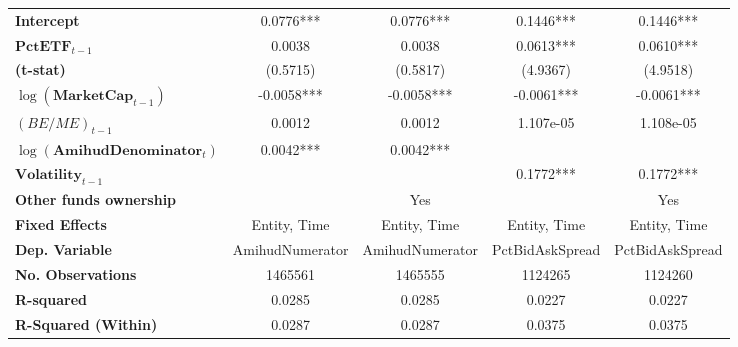 {\begin{longtable}{>{\bfseries}lcccc}
Intercept                                &        0.0776***       &             0.0776***             &        0.1446***       &              0.1446***      \\
\rowcolor{blue!20}
$\mathbf{PctETF}_{t-1}$       &        0.0038       &             0.0038             &        0.0613***      &              0.0610***              \\
(t-stat)                                 &       (0.5715)      &            (0.5817)            &       (4.9367)      &             (4.9518)             \\
$\log(\mathbf{MarketCap}_{t-1})$   &       -0.0058***       &            -0.0058***             &       -0.0061***       &             -0.0061***              \\
$\left(BE/ME\right)_{t-1}$            &        0.0012       &             0.0012             &      1.107e-05      &            1.108e-05             \\
$\log(\mathbf{AmihudDenominator}_t)$         &        0.0042***       &             0.0042***             &                     &                                  \\
$\mathbf{Volatility}_{t-1}$                  &                     &                                &        0.1772***       &              0.1772***              \\
Other funds ownership        &                     &                  Yes              &                    &              Yes\\
\midrule
Fixed Effects                           &        Entity, Time       &             Entity, Time             &        Entity, Time       &              Entity, Time \\
\bottomrule
\toprule
\textbf{Dep. Variable}                     &   AmihudNumerator   &        AmihudNumerator         &   PctBidAskSpread   &         PctBidAskSpread          \\
\textbf{No. Observations}                  &       1465561       &            1465555             &       1124265       &             1124260              \\
\textbf{R-squared}                         &        0.0285       &             0.0285             &        0.0227       &              0.0227              \\
\textbf{R-Squared (Within)}                &        0.0287       &             0.0287             &        0.0375       &              0.0375              \\

\end{longtable}}
